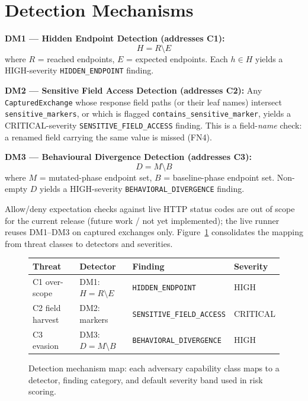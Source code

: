 \documentclass[12pt,a4paper]{report}
\begin{document}
\section{Detection Mechanisms}

\textbf{DM1 --- Hidden Endpoint Detection (addresses C1):}
\[
    H = R \setminus E
\]
where $R$ = reached endpoints, $E$ = expected endpoints. Each $h \in H$ yields a
HIGH-severity \texttt{HIDDEN\_ENDPOINT} finding.

\textbf{DM2 --- Sensitive Field Access Detection (addresses C2):}
Any \texttt{CapturedExchange} whose response field paths (or their leaf names) intersect
\texttt{sensitive\_markers}, or which is flagged \texttt{contains\_sensitive\_marker}, yields a
CRITICAL-severity \texttt{SENSITIVE\_FIELD\_ACCESS} finding. This is a field-\emph{name} check:
a renamed field carrying the same value is missed (FN4).

\textbf{DM3 --- Behavioural Divergence Detection (addresses C3):}
\[
    D = M \setminus B
\]
where $M$ = mutated-phase endpoint set, $B$ = baseline-phase endpoint set. Non-empty $D$
yields a HIGH-severity \texttt{BEHAVIORAL\_DIVERGENCE} finding.

Allow/deny expectation checks against live HTTP status codes are out of scope for the
current release (future work / not yet implemented); the live runner reuses DM1--DM3 on
captured exchanges only.
Figure~\ref{fig:dm-map} consolidates the mapping from threat classes to detectors and severities.

\begin{figure}[H]
    \centering
    {\footnotesize
    \renewcommand{\arraystretch}{1.35}
    \setlength{\tabcolsep}{6pt}
    \begin{tabular}{@{}>{\raggedright\arraybackslash}p{2.35cm}
                         >{\raggedright\arraybackslash}p{2.65cm}
                         >{\raggedright\arraybackslash}p{4.1cm}
                         >{\raggedright\arraybackslash}p{1.85cm}@{}}
        \toprule
        \textbf{Threat} & \textbf{Detector} & \textbf{Finding} & \textbf{Severity} \\
        \midrule
        C1 over-scope &
            DM1: $H = R \setminus E$ &
            \texttt{HIDDEN\_ENDPOINT} &
            HIGH \\
        C2 field harvest &
            DM2: markers &
            \texttt{SENSITIVE\_FIELD\_ACCESS} &
            CRITICAL \\
        C3 evasion &
            DM3: $D = M \setminus B$ &
            \texttt{BEHAVIORAL\_DIVERGENCE} &
            HIGH \\
        \bottomrule
    \end{tabular}
    }
    \caption{Detection mechanism map: each adversary capability class maps to a detector, finding
             category, and default severity band used in risk scoring.}
    \label{fig:dm-map}
\end{figure}
\end{document}
